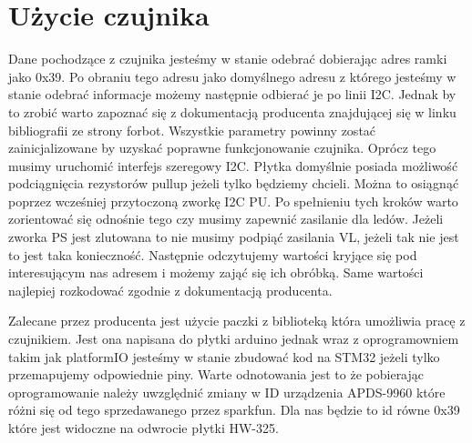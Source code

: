 \documentclass[11pt, a4paper]{article}
\begin{document}
\section{Użycie czujnika}
Dane pochodzące z czujnika jesteśmy w stanie odebrać dobierając adres ramki jako 0x39. Po obraniu tego adresu jako domyślnego adresu z którego jesteśmy w stanie odebrać informacje możemy następnie odbierać je po linii I2C. Jednak by to zrobić warto zapoznać się z dokumentacją producenta znajdującej się w linku bibliografii ze strony forbot\cite{FORBOT}. Wszystkie parametry powinny zostać zainicjalizowane by uzyskać poprawne funkcjonowanie czujnika. Oprócz tego musimy uruchomić interfejs szeregowy I2C. Płytka domyślnie posiada możliwość podciągnięcia rezystorów pullup jeżeli tylko będziemy chcieli. Można to osiągnąć poprzez wcześniej przytoczoną zworkę I2C PU. Po spełnieniu tych kroków warto zorientować się odnośnie tego czy musimy zapewnić zasilanie dla ledów. Jeżeli zworka PS jest zlutowana to nie musimy podpiąć zasilania VL, jeżeli tak nie jest to jest taka konieczność. Następnie odczytujemy wartości kryjące się pod interesującym nas adresem i możemy zająć się ich obróbką. Same wartości najlepiej rozkodować zgodnie z dokumentacją producenta.

Zalecane przez producenta jest użycie paczki z biblioteką która umożliwia pracę z czujnikiem. Jest ona napisana do płytki arduino jednak wraz z oprogramowniem takim jak platformIO jesteśmy w stanie zbudować kod na STM32 jeżeli tylko przemapujemy odpowiednie piny. Warte odnotowania jest to że pobierając oprogramowanie należy uwzględnić zmiany w ID urządzenia APDS-9960 które różni się od tego sprzedawanego przez sparkfun. Dla nas będzie to id równe 0x39 które jest widoczne na odwrocie płytki HW-325.
\end{document}
